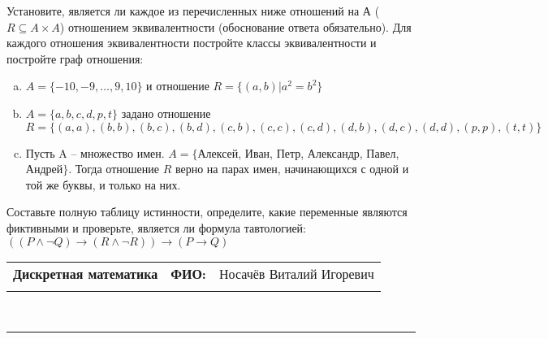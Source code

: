 \documentclass[10pt]{exam}
\newcommand{\class}{Дискретная математика}
\newcommand{\examdate}{}
\begin{document}
\begin{questions}
\question
Установите, является ли каждое из перечисленных ниже отношений на А ($R \subseteq A \times A$) отношением эквивалентности (обоснование ответа обязательно). Для каждого отношения эквивалентности постройте классы 
эквивалентности и постройте граф отношения:
\begin{enumerate} [a)]\setcounter{enumi}{0}
\item $A = \{-10, -9, … , 9, 10\}$ и отношение $R = \{(a,b)|a^{2} = b^{2}\}$
\item $A = \{a, b, c, d, p, t\}$ задано отношение $R = \{(a, a), (b, b), (b, c), (b, d), (c, b), (c, c), (c, d), (d, b), (d, c), (d, d), (p,p), (t,t)\}$
\item Пусть A – множество имен. $A = \{ $Алексей, Иван, Петр, Александр, Павел, Андрей$ \}$. Тогда отношение $R$ верно на парах имен, начинающихся с одной и той же буквы, и только на них.
\end{enumerate}\question Составьте полную таблицу истинности, определите, какие переменные являются фиктивными и проверьте, является ли формула тавтологией:
$(( P \land \neg Q) \rightarrow (R \land \neg R)) \rightarrow (P \rightarrow Q)$

\end{questions}
\newpage
\begin{flushright}
\begin{tabular}{p{2.8in} r l}
\textbf{\class} & \textbf{ФИО:} &Носачёв Виталий Игоревич
\\

\textbf{\examdate} &&\\
\end{tabular}\\
\end{flushright}
\rule[1ex]{\textwidth}{.1pt}
\end{document}
